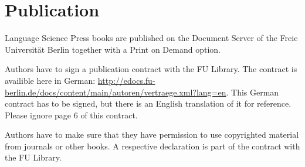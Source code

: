 \chapter{Publication}
\label{chap-publication}


Language Science Press books are published on the Document Server of the Freie Universität Berlin
together with a Print on Demand option.



Authors have to sign a publication contract with the FU Library. The contract is availible here in
German:
\url{http://edocs.fu-berlin.de/docs/content/main/autoren/vertraege.xml?lang=en}. This
German contract has to be signed, but there is an English translation of it for reference.
Please ignore page 6 of this contract.


Authors have to make sure that they have permission to use copyrighted material from journals or
other books. A respective declaration is part of the contract with the FU Library.

